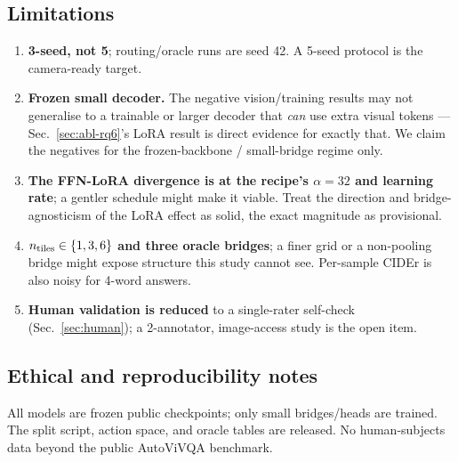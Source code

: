 \subsection{Limitations}

\begin{enumerate}
\item \textbf{3-seed, not 5}; routing/oracle runs are seed 42. A 5-seed protocol
  is the camera-ready target.
\item \textbf{Frozen small decoder.} The negative vision/training results may not
  generalise to a trainable or larger decoder that \emph{can} use extra visual
  tokens --- Sec.~\ref{sec:abl-rq6}'s LoRA result is direct evidence for exactly
  that. We claim the negatives for the frozen-backbone / small-bridge regime only.
\item \textbf{The FFN-LoRA divergence is at the recipe's $\alpha=32$ and learning
  rate}; a gentler schedule might make it viable. Treat the direction and
  bridge-agnosticism of the LoRA effect as solid, the exact magnitude as
  provisional.
\item \textbf{$n_{\text{tiles}} \in \{1,3,6\}$ and three oracle bridges}; a finer grid or a
  non-pooling bridge might expose structure this study cannot see. Per-sample
  CIDEr is also noisy for 4-word answers.
\item \textbf{Human validation is reduced} to a single-rater self-check
  (Sec.~\ref{sec:human}); a 2-annotator, image-access study is the open item.
\end{enumerate}

\subsection{Ethical and reproducibility notes}

All models are frozen public checkpoints; only small bridges/heads are trained.
The split script, action space, and oracle tables are released. No human-subjects
data beyond the public AutoViVQA benchmark.

